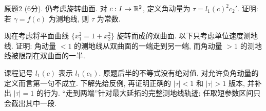 \par{}
\begin{exercise}\label{ps:10-2}
原题2 (6分). 仍考虑旋转曲面. 对 $c:I\to\mathbb R^2$, 定义角动量为 $\tau=l_1(c)^2c_2'$. 证明: 若 $\gamma=f(c)$ 为测地线, 则 $\tau$ 为常数.

现在考虑将平面曲线 $\{x_1^2=1+x_2^2\}$ 旋转而成的双曲面. 以下只考虑单位速度测地线. 证明: 角动量 $<1$ 的测地线从双曲面的一端走到另一端, 而角动量 $>1$ 的测地线被限制在双曲面的一半.
\end{exercise}
\begin{remark}
课程记号 $l_1(c)$ 表示 $l_1(c_1)$. 原题后半的不等式没有绝对值, 对允许负角动量的定义而言第一句不成立. 下解先给反例, 再证明正确的 $|\tau|<1$ 和 $|\tau|>1$ 版本, 并补出 $|\tau|=1$ 的行为. “走到两端”针对最大延拓的完整测地线轨迹; 任取短参数区间只会截出其中一段.
\end{remark}
